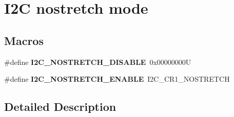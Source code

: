\hypertarget{group___i2_c__nostretch__mode}{}\section{I2C nostretch mode}
\label{group___i2_c__nostretch__mode}
\subsection*{Macros}
\begin{DoxyCompactItemize}
\item 
\mbox{\label{group___i2_c__nostretch__mode_ga611deefe89e56fa65f853e6796f2cf66}} 
\#define {\bfseries I2\+C\+\_\+\+N\+O\+S\+T\+R\+E\+T\+C\+H\+\_\+\+D\+I\+S\+A\+B\+LE}~0x00000000U
\item 
\mbox{\label{group___i2_c__nostretch__mode_ga67ebace1182d99bb5d7968994c01c80e}} 
\#define {\bfseries I2\+C\+\_\+\+N\+O\+S\+T\+R\+E\+T\+C\+H\+\_\+\+E\+N\+A\+B\+LE}~I2\+C\+\_\+\+C\+R1\+\_\+\+N\+O\+S\+T\+R\+E\+T\+CH
\end{DoxyCompactItemize}


\subsection{Detailed Description}
